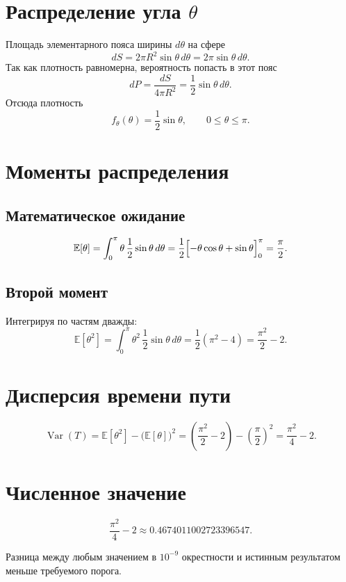 \documentclass{article}
\begin{document}
\section{Распределение угла \texorpdfstring{$\theta$}{θ}}

Площадь элементарного пояса ширины $d\theta$ на сфере
\[
  dS = 2\pi R^{2}\sin\theta\,d\theta = 2\pi\sin\theta\,d\theta .
\]
Так как плотность равномерна, вероятность попасть в этот пояс
\[
  dP = \frac{dS}{4\pi R^{2}}=\frac12\sin\theta\,d\theta .
\]
Отсюда плотность
\[
  f_{\theta}(\theta)=\frac12\sin\theta,\qquad 0\le\theta\le\pi.
\]

\section{Моменты распределения}

\subsection{Математическое ожидание}

\[
  \mathbb E[\theta]=\int_{0}^{\pi} \theta\,\frac12\sin\theta\,d\theta
  =\frac12\Bigl[-\theta\cos\theta+\sin\theta\Bigr]_{0}^{\pi}
  =\frac{\pi}{2}.
\]

\subsection{Второй момент}

Интегрируя по частям дважды:
\[
  \mathbb E[\theta^{2}]
  =\int_{0}^{\pi}\theta^{2}\,\frac12\sin\theta\,d\theta
  =\frac12\left(\pi^{2}-4\right)
  =\frac{\pi^{2}}{2}-2.
\]

\section{Дисперсия времени пути}

\[
  \operatorname{Var}(T)=\mathbb E[\theta^{2}]-
        \bigl(\mathbb E[\theta]\bigr)^{2}
        =\left(\frac{\pi^{2}}{2}-2\right)-\left(\frac{\pi}{2}\right)^{2}
        =\frac{\pi^{2}}{4}-2.
\]

\section{Численное значение}

\[
  \frac{\pi^{2}}{4}-2 \approx 0.4674011002723396547.
\]

Разница между любым значением в $10^{-9}$ окрестности и истинным результатом
меньше требуемого порога.
\end{document}
